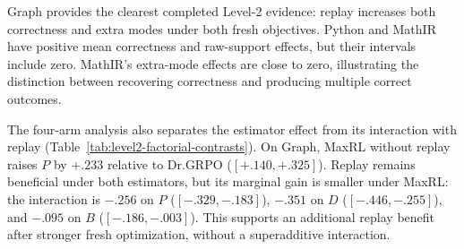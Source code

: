 \begin{table}[H]
  \centering
  \caption{\textbf{Replay effects on the harder Level-2 tasks at pass 8.}
  MaxRL and Dr.GRPO identify the fresh objective; each effect is its replay
  variant minus the corresponding objective without replay. Each row uses
  its own pairwise intersection, which can exceed the four-method
  intersection. Brackets give paired Student-$t$ intervals for $\Delta B$
  only when all five registered pairs are available.}
  \label{tab:current-e119}
  \scriptsize
  \setlength{\tabcolsep}{3pt}
\end{table}

Graph provides the clearest completed Level-2 evidence: replay increases
both correctness and extra modes under both fresh objectives. Python and
MathIR have positive mean correctness and raw-support effects, but their
intervals include zero. MathIR's extra-mode effects are close to zero,
illustrating the distinction between recovering correctness and producing
multiple correct outcomes.

The four-arm analysis also separates the estimator effect from its
interaction with replay (Table~\ref{tab:level2-factorial-contrasts}). On
Graph, MaxRL without replay raises $P$ by $+.233$ relative to Dr.GRPO
($[+.140,+.325]$). Replay remains beneficial under both estimators, but its
marginal gain is smaller under MaxRL: the interaction is $-.256$ on $P$
($[-.329,-.183]$), $-.351$ on $D$ ($[-.446,-.255]$), and $-.095$ on $B$
($[-.186,-.003]$). This supports an additional replay benefit after stronger
fresh optimization, without a superadditive interaction.

\begin{table}[H]
  \centering
  \caption{\textbf{Fresh-objective effects and replay interactions on Level 2.}
  All three contrasts within a domain use the same four-arm seed
  intersection. The interaction is
  $(\mathrm{ReplayMaxRL}-\mathrm{MaxRL})-
  (\mathrm{ReplayDr.GRPO}-\mathrm{Dr.GRPO})$.
  Each entry gives its mean and, only for a complete five-seed block, a
  paired unadjusted 95\% Student-$t$ interval.}
  \label{tab:level2-factorial-contrasts}
  \scriptsize
  \setlength{\tabcolsep}{3pt}
\end{table}

